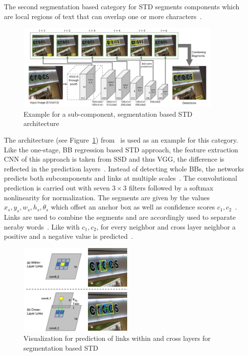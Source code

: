 The second segmentation based category for \ac{STD} segments components which are local regions of
text that can overlap one or more characters~\citep{long_scene_2021}.
\begin{figure}[ht]
    \centering
    \includegraphics[width=0.9\textwidth]{img/STD-seg-based-architecture-Shi-Detecting-2017.png}
    \caption[Sub-component, segmentation based STD architecture]{%
        Example for a sub-component, segmentation based STD
        architecture~\citep{shi_detecting_2017}\label{fig:STD-segbased-component-architecture}
    }
\end{figure}
The architecture (see Figure~\ref{fig:STD-segbased-component-architecture})
from~\cite{shi_detecting_2017} is used as an example for this category.
Like the one-stage, \ac{BB} regression based \ac{STD} approach, the feature extraction \ac{CNN} of
this approach is taken from SSD and thus VGG, the difference is reflected in the prediction
layers~\citep{shi_detecting_2017,liu_ssd_2016,simonyan_very_2015}.
Instead of detecting whole \acp{BB}, the networks predicts both subcomponents and links at multiple
scales~\citep{shi_detecting_2017}.
The convolutional prediction is carried out with seven $3\times3$ filters followed by a softmax
nonlinearity for normalization.
The segments are given by the values $x_s,y_s,w_s,h_s,\theta_s$ which offset an anchor box as well
as confidence scores $c_1,c_2$~\citep{shi_detecting_2017}.
Links are used to combine the segments and are accordingly used to separate neraby
words~\citep{shi_detecting_2017}.
Like with $c_1,c_2$, for every neighbor and cross layer neighbor a positive and a negative value
is predicted~\citep{shi_detecting_2017}.
\begin{figure}[ht]
    \centering
    \includegraphics[width=0.5\textwidth]{img/STD-seg-based-links-Shi-Detecting-2017.png}
    \caption[Predicting links for segmentation based STD]{%
        Visualization for prediction of links within and cross layers for segmentation based
        STD~\citep{shi_detecting_2017}\label{fig:STD-segbased-component-links}
    }
\end{figure}
